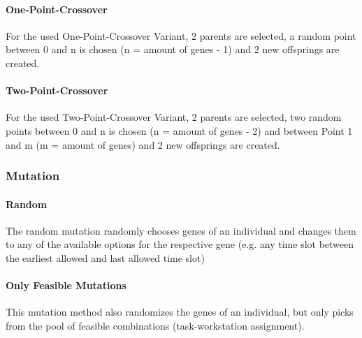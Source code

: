 \documentclass[a4paper,12pt,twoside]{scrreprt}
\begin{document}
\begin{flushleft}
\paragraph{One-Point-Crossover}
For the used One-Point-Crossover Variant, 2 parents are selected, a random point between 0 and n is chosen (n = amount of genes - 1) and 2 new offsprings are created.

\paragraph{Two-Point-Crossover}
For the used Two-Point-Crossover Variant, 2 parents are selected, two random points between 0 and n is chosen (n = amount of genes - 2) and between Point 1 and m (m = amount of genes) and 2 new offsprings are created.

\subsubsection{Mutation}

\paragraph{Random}
The random mutation randomly chooses genes of an individual and changes them to any of the available options for the respective gene (e.g. any time slot between the earliest allowed and last allowed time slot)

\paragraph{Only Feasible Mutations}
This mutation method also randomizes the genes of an individual, but only picks from the pool of feasible combinations (task-workstation assignment).


\end{flushleft}
\end{document}
